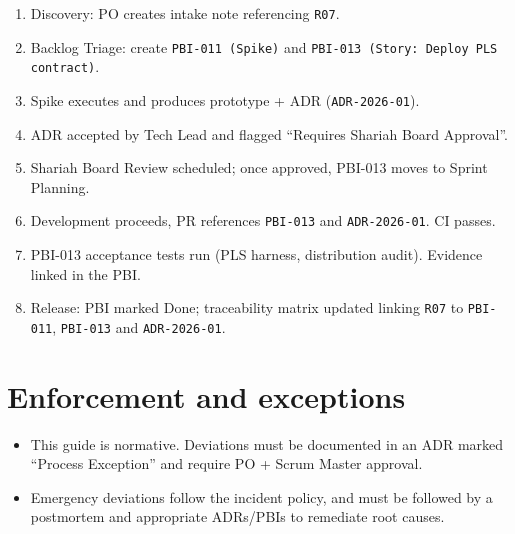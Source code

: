 \documentclass[11pt,a4paper]{article}
\begin{document}
\begin{enumerate}[leftmargin=*]
  \item Discovery: PO creates intake note referencing \texttt{R07}.
  \item Backlog Triage: create \texttt{PBI-011 (Spike)} and \texttt{PBI-013 (Story: Deploy PLS contract)}.
  \item Spike executes and produces prototype + ADR (\texttt{ADR-2026-01}).
  \item ADR accepted by Tech Lead and flagged ``Requires Shariah Board Approval''.
  \item Shariah Board Review scheduled; once approved, PBI-013 moves to Sprint Planning.
  \item Development proceeds, PR references \texttt{PBI-013} and \texttt{ADR-2026-01}. CI passes.
  \item PBI-013 acceptance tests run (PLS harness, distribution audit). Evidence linked in the PBI.
  \item Release: PBI marked Done; traceability matrix updated linking \texttt{R07} to \texttt{PBI-011}, \texttt{PBI-013} and \texttt{ADR-2026-01}.
\end{enumerate}

\section{Enforcement and exceptions}
\begin{itemize}
  \item This guide is normative. Deviations must be documented in an ADR marked ``Process Exception'' and require PO + Scrum Master approval.
  \item Emergency deviations follow the incident policy, and must be followed by a postmortem and appropriate ADRs/PBIs to remediate root causes.
\end{itemize}
\end{document}
